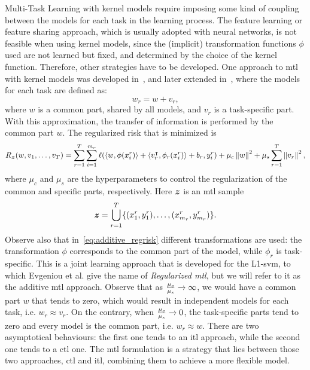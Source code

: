 Multi-Task Learning with kernel models require imposing some kind of coupling between the models for each task in the learning process. The feature learning or feature sharing approach, which is usually adopted with neural networks, is not feasible when using kernel models, since the (implicit) transformation functions $\phi$ used are not learned but fixed, and determined by the choice of the kernel function. Therefore, other strategies have to be developed. 
One approach to \acrshort{mtl} with kernel models was developed in~\cite{EvgeniouP04}, and later extended in~\citet{CaiC09, CaiC12}, where the models for each task are defined as:
\begin{equation}
    \nonumber
    {w}_r = {w} + {v}_r,
\end{equation} 
where $w$ is a common part, shared by all models, and $v_r$ is a task-specific part. With this approximation, the transfer of information is performed by the common part ${w}$.
The regularized risk that is minimized is 
\begin{equation}
    \label{eq:additive_regrisk}
    \risk_{\bsample} ({w, v_1, \ldots, v_\ntasks}) = \sum_{r=1}^{\ntasks} \sum_{i=1}^{\npertask_r} \lossf(
        \dotp{w}{\phi({x}_i^r)} + \dotp{{v}_r^\intercal}{\phi_r({x}_i^r)} + b_r, y_i^r) + \mu_c \norm{{w}}^2 + \mu_s \sum_{r=1}^\ntasks \norm{{v}_r}^2,
\end{equation}
where $\mu_c$ and $\mu_s$ are the hyperparameters to control the regularization of the common and specific parts, respectively. Here $\bm{z}$ is an \acrshort{mtl} sample $$\bm{z} = \bigcup_{r=1}^T \{(x_1^r, y_1^r), \ldots, (x_{m_r}^r, y_{m_r}^r)\}.$$
Observe also that in~\eqref{eq:additive_regrisk} different transformations are used: the transformation $\phi$ corresponds to the common part of the model, while $\phi_r$ is task-specific.
%
This is a joint learning approach that is developed for the L1-\acrshort{svm}, to which Evgeniou et al. give the name of \emph{Regularized \acrshort{mtl}}, but we will refer to it as the {additive} \acrshort{mtl} approach.
%
Observe that as $\frac{\mu_c}{\mu_s} \xrightarrow[]{} \infty $, we would have a common part ${w}$ that tends to zero, which would result in independent models for each task, i.e. ${w}_r \approx {v}_r$. On the contrary, when $\frac{\mu_c}{\mu_s} \xrightarrow[]{} 0 $, the task-specific parts tend to zero and every model is the common part, i.e. ${w}_r \approx {w}$.
There are two asymptotical behaviours: the first one tends to an \acrfull{itl} approach, while the second one tends to a \acrfull{ctl} one. The \acrshort{mtl} formulation is a strategy that lies between those two approaches, \acrshort{ctl} and \acrshort{itl}, combining them to achieve a more flexible model.

